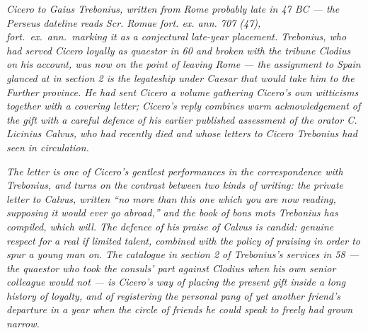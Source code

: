 
\textit{Cicero to Gaius Trebonius, written from Rome
probably late in 47 BC --- the Perseus dateline reads
\textit{Scr. Romae fort. ex. ann. 707 (47)}, \textit{fort.\
ex.\ ann.}\ marking it as a conjectural late-year placement.
Trebonius, who had served Cicero loyally as quaestor in 60
and broken with the tribune Clodius on his account, was
now on the point of leaving Rome --- the assignment to
Spain glanced at in section 2 is the legateship under
Caesar that would take him to the Further province. He
had sent Cicero a volume gathering Cicero's own witticisms
together with a covering letter; Cicero's reply combines
warm acknowledgement of the gift with a careful defence of
his earlier published assessment of the orator C. Licinius
Calvus, who had recently died and whose letters to Cicero
Trebonius had seen in circulation.}

\textit{The letter is one of Cicero's gentlest performances
in the correspondence with Trebonius, and turns on the
contrast between two kinds of writing: the private letter
to Calvus, written ``no more than this one which you are
now reading, supposing it would ever go abroad,'' and the
book of \textit{bons mots} Trebonius has compiled, which
will. The defence of his praise of Calvus is candid:
genuine respect for a real if limited talent, combined with
the policy of praising in order to spur a young man on. The
catalogue in section 2 of Trebonius's services in 58 ---
the quaestor who took the consuls' part against Clodius
when his own senior colleague would not --- is Cicero's way
of placing the present gift inside a long history of
loyalty, and of registering the personal pang of yet
another friend's departure in a year when the circle of
friends he could speak to freely had grown narrow.}

